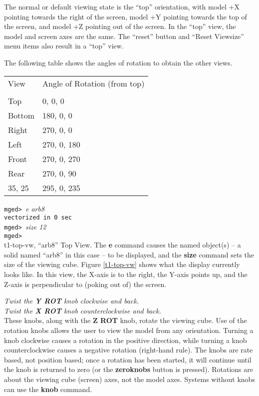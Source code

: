 The normal or default viewing state is the ``top'' orientation,
with model +X pointing towards the right of the screen,
model +Y pointing towards the top of the screen,
and model +Z pointing out of the screen.
In the ``top'' view, the model and screen axes are the same.
The ``reset'' button and ``Reset Viewsize'' menu items also
result in a ``top'' view.

The following table shows the angles of rotation to obtain the other views.
\begin{tabular}{l l}
View    &            Angle of Rotation (from top) \\
 \\
Top      &                     0, 0, 0 \\
Bottom   &                   180, 0, 0 \\
Right    &                   270, 0, 0 \\
Left     &                  270, 0, 180 \\
Front    &                  270, 0, 270 \\
Rear     &                  270, 0, 90 \\
35, 25   &                  295, 0, 235 \\
\end{tabular}

\noindent
{\tt mged>\ }{\em e arb8}\\
{\tt vectorized in 0 sec}\\
{\tt mged>\ }{\em size 12}\\
{\tt mged> }\\

\mfig t1-top-vw, ``arb8'' Top View.
The {\bf e} command causes the named object(s) -- a solid named ``arb8''
in this case
-- to be displayed, and the {\bf size} command sets the size of the
viewing cube. Figure \ref{t1-top-vw} shows what the display currently
looks like.  In this view, the X-axis is to the right, the Y-axis points
up, and the Z-axis is perpendicular to (poking out of) the screen.

\noindent
{\em Twist the {\bf Y ROT} knob clockwise and back.}\\
{\em Twist the {\bf X ROT} knob counterclockwise and back.}\\

These knobs, along with the {\bf Z ROT} knob, rotate the viewing cube.
Use of the rotation
knobs allows the user to view the model from any orientation.
Turning a knob clockwise causes a rotation in the positive direction,
while turning a knob counterclockwise causes a negative rotation
(right-hand rule).  The knobs are rate based, not position based;
once a rotation has been started, it will continue until the
knob is returned to zero (or the {\bf zeroknobs} button is pressed).
Rotations are about the viewing cube (screen) axes, not the model axes.
Systems without knobs can use the {\bf knob} command.

